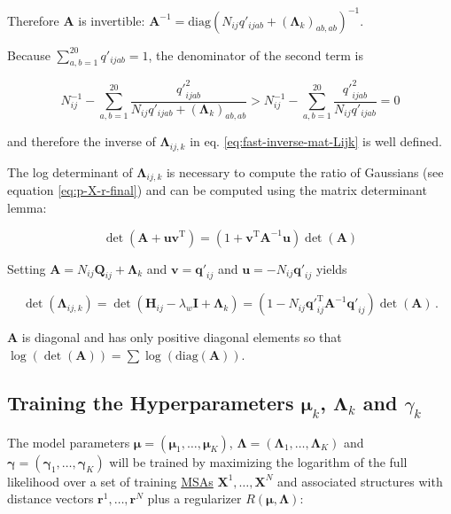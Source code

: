 \documentclass[12pt,a4paper,twoside]{book}
\renewcommand{\H}{\mathbf{H}}
\newcommand{\I}{\mathbf{I}}
\newcommand{\Lijk}{\mathbf{\Lambda}_{ij,k}}
\newcommand{\Lk}{\mathbf{\Lambda}_k}
\newcommand{\muk}{\mathbf{\mu}_k}
\renewcommand{\r}{\mathbf{r}}
\newcommand{\Qij}{\mathbf{Q}_{ij}}
\newcommand{\qij}{\mathbf{q\prime}_{ij}}
\renewcommand{\v}{\mathbf{v}}
\newcommand{\X}{\mathbf{X}}
\theoremstyle{definition}
\theoremstyle{definition}
\theoremstyle{remark}
\begin{document}
Therefore \(\mathbf{A}\) is invertible:
\(\mathbf{A}^{-1} = \text{diag}(N_{ij} q'_{ijab} + (\Lk)_{ab,ab} )^{-1}\).

Because \(\sum_{a,b=1}^{20} q'_{ijab} = 1\), the denominator of the
second term is

\begin{equation}
    N_{ij}^{-1} - \sum_{a,b=1}^{20}  \frac{{q'}_{ijab}^2}{N_{ij} q'_{ijab} + {(\Lk)}_{ab,ab} } > N_{ij}^{-1} - \sum_{a,b=1}^{20} \frac{{q'}^2_{ijab}}{N_{ij} q'_{ijab}} = 0
\end{equation}

and therefore the inverse of \(\Lijk\) in eq.
\eqref{eq:fast-inverse-mat-Lijk} is well defined.

The log determinant of \(\Lijk\) is necessary to compute the ratio of
Gaussians (see equation \eqref{eq:p-X-r-final}) and can be computed using
the matrix determinant lemma:

\begin{equation}
  \det(\mathbf{A} + \mathbf{uv}^\mathrm{T}) = (1+\mathbf{v}^\mathrm{T} \mathbf{A}^{-1} \mathbf{u}) \det(\mathbf{A})
\end{equation}

Setting \(\mathbf{A} = N_{ij} \Qij + \Lk\) and \(\v = \qij\) and
\(\mathbf{u} = - N_{ij} \qij\) yields

\begin{equation}
  \det(\Lijk ) = \det(\H_{ij} - \lambda_w \I + \Lk) = (1 - N_{ij}\qij^\mathrm{T} \mathbf{A}^{-1}\qij) \det(\mathbf{A}) \,.
\end{equation}

\(\mathbf{A}\) is diagonal and has only positive diagonal elements so
that
\(\log(\det(\mathbf{A})) = \sum \log \left( \text{diag}(\mathbf{A}) \right)\).

\subsection{\texorpdfstring{Training the Hyperparameters \(\muk\),
\(\Lk\) and
\(\gamma_k\)}{Training the Hyperparameters \textbackslash{}muk, \textbackslash{}Lk and \textbackslash{}gamma\_k}}\label{training-hyperparameters}

The model parameters
\(\mathbf{\mu} = (\mathbf{\mu}_{1},\ldots,\mathbf{\mu}_K)\),
\(\mathbf{\Lambda} = (\mathbf{\Lambda}_1,\ldots,\mathbf{\Lambda}_K)\)
and \(\mathbf{\gamma} = (\mathbf{\gamma}_1,\ldots,\mathbf{\gamma}_K)\)
will be trained by maximizing the logarithm of the full likelihood over
a set of training \protect\hyperlink{abbrev}{MSAs} \(\X^1,\ldots,\X^N\)
and associated structures with distance vectors \(\r^1,\ldots,\r^N\)
plus a regularizer \(R(\mathbf{\mu}, \mathbf{\Lambda})\):
\end{document}
